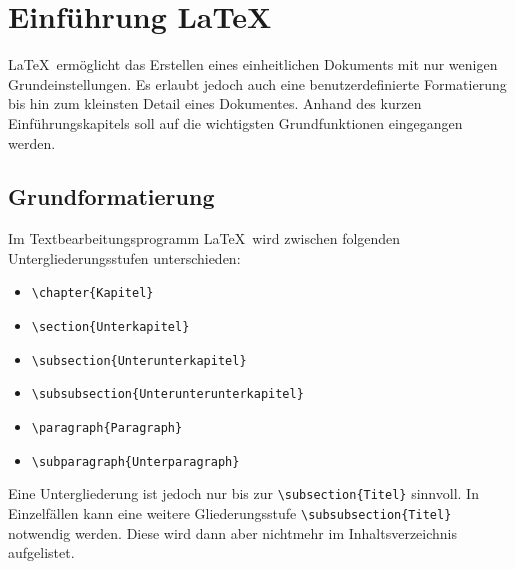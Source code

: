 \chapter{Einführung \LaTeX}
\LaTeX~ermöglicht das Erstellen eines einheitlichen Dokuments mit nur wenigen Grundeinstellungen. Es erlaubt jedoch auch eine benutzerdefinierte Formatierung bis hin zum kleinsten Detail eines Dokumentes. Anhand des kurzen Einführungskapitels soll auf die wichtigsten Grundfunktionen eingegangen werden.

\section{Grundformatierung}
Im Textbearbeitungsprogramm \LaTeX~wird zwischen folgenden Untergliederungsstufen unterschieden:
\begin{itemize}
	\item \verb|\chapter{Kapitel}|
	\item \verb|\section{Unterkapitel}|
	\item \verb|\subsection{Unterunterkapitel}|
	\item \verb|\subsubsection{Unterunterunterkapitel}|
	\item \verb|\paragraph{Paragraph}|
	\item \verb|\subparagraph{Unterparagraph}|
\end{itemize}

Eine Untergliederung ist jedoch nur bis zur \verb|\subsection{Titel}| sinnvoll. In Einzelfällen kann eine weitere Gliederungsstufe \verb|\subsubsection{Titel}| notwendig werden. Diese wird dann aber nichtmehr im Inhaltsverzeichnis aufgelistet.\\

